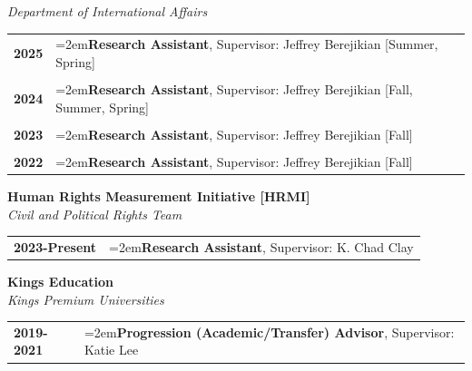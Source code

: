 \documentclass[letterpaper,12pt]{article}
\begin{document}
\textit{Department of International Affairs}
\begin{xltabular}{\dimexpr\textwidth-0in}{p{1.5in}X}

\textbf{2025} & \hangindent=2em\textbf{Research Assistant}, Supervisor: Jeffrey Berejikian [Summer, Spring]\\ \\
			
\textbf{2024} & \hangindent=2em\textbf{Research Assistant}, Supervisor: Jeffrey Berejikian [Fall, Summer, Spring]\\ \\

\textbf{2023} & \hangindent=2em\textbf{Research Assistant}, Supervisor: Jeffrey Berejikian [Fall]\\ \\

\textbf{2022}  & \hangindent=2em\textbf{Research Assistant}, Supervisor: Jeffrey Berejikian [Fall]
\end{xltabular}

\textbf{Human Rights Measurement Initiative [HRMI]}\\
\textit{Civil and Political Rights Team}
\begin{xltabular}{\dimexpr\textwidth-0in}{p{1.5in}X}
\textbf{2023-Present} & \hangindent=2em\textbf{Research Assistant}, Supervisor: K. Chad Clay
\end{xltabular}

\textbf{Kings Education}\\
\textit{Kings Premium Universities}
\begin{xltabular}{\dimexpr\textwidth-0in}{p{1.5in}X}
\textbf{2019-2021} & \hangindent=2em\textbf{Progression (Academic/Transfer) Advisor}, Supervisor: Katie Lee
\end{xltabular}

\end{document}
